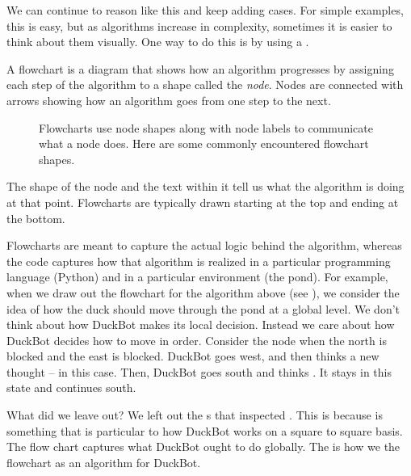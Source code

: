We can continue to reason like this and keep adding cases. For simple examples, this is easy, but as
algorithms increase in complexity, sometimes it is easier to think about them visually. One way to
do this is by using a .

A flowchart is a diagram that shows how an algorithm progresses by assigning each step of the
algorithm to a shape called the \emph{node}. Nodes are connected with arrows showing how an
algorithm goes from one step to the next.

\begin{figure}
  \centering
  
  \caption{Flowcharts use node shapes along with node labels to communicate what a node does. Here are some commonly encountered flowchart shapes.}
  \label{fig:flowchart-shapes}
\end{figure}


The shape of the node and the text within it tell us what the algorithm is doing at that
point. Flowcharts are typically drawn starting at the top and ending at the bottom.

Flowcharts are meant to capture the actual logic behind the algorithm, whereas the code captures how
that algorithm is realized in a particular programming language (Python) and in a particular
environment (the pond). For example, when we draw out the flowchart for the algorithm above (see
), we consider the idea of how the duck should move through the pond at a
global level. We don't think about how DuckBot makes its local decision. Instead we care about how
DuckBot decides how to move in order. Consider the node when the north is blocked and the east is
blocked. DuckBot goes west, and then thinks a new thought --  in this
case. Then, DuckBot goes south and thinks . It stays in this state and continues south.

What did we leave out? We left out the s that inspected . This is because
 is something that is particular to how DuckBot works on a square to square basis. The
flow chart captures what DuckBot ought to do globally.  The  is how we  the flowchart as an algorithm for
DuckBot.

